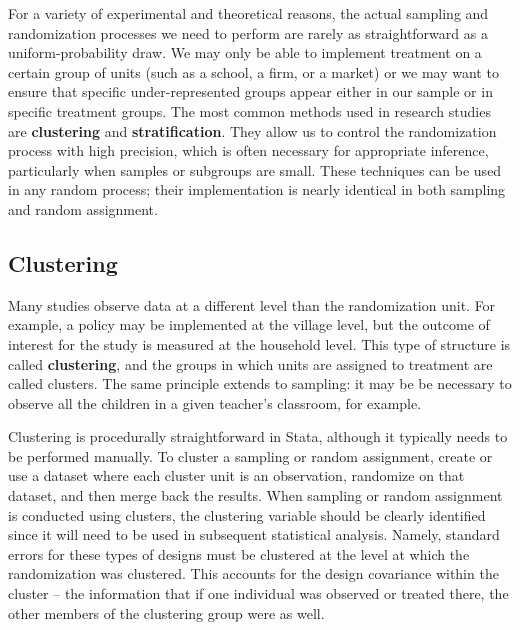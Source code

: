For a variety of experimental and theoretical reasons,
the actual sampling and randomization processes we need to perform
are rarely as straightforward as a uniform-probability draw.
We may only be able to implement treatment on a certain group of units
(such as a school, a firm, or a market)
or we may want to ensure that specific under-represented groups appear
either in our sample or in specific treatment groups.
The most common methods used in research studies
are \textbf{clustering} and \textbf{stratification}.
They allow us to control the randomization process with high precision,
which is often necessary for appropriate inference,
particularly when samples or subgroups are small.\cite{athey2017econometrics}
These techniques can be used in any random process;
their implementation is nearly identical in both sampling and random assignment.

\subsection{Clustering}

Many studies observe data at a different level than the randomization unit.
For example, a policy may be implemented at the village level,
but the outcome of interest for the study is measured at the household level.
This type of structure is called \textbf{clustering},
and the groups in which units are assigned to treatment are called clusters.
The same principle extends to sampling:
it may be be necessary to observe all the children
in a given teacher's classroom, for example.

Clustering is procedurally straightforward in Stata,
although it typically needs to be performed manually.
To cluster a sampling or random assignment,
create or use a dataset where each cluster unit is an observation,
randomize on that dataset, and then merge back the results.
When sampling or random assignment is conducted using clusters,
the clustering variable should be clearly identified
since it will need to be used in subsequent statistical analysis.
Namely, standard errors for these types of designs must be clustered
at the level at which the randomization was clustered.
This accounts for the design covariance within the cluster --
the information that if one individual was observed or treated there,
the other members of the clustering group were as well.

